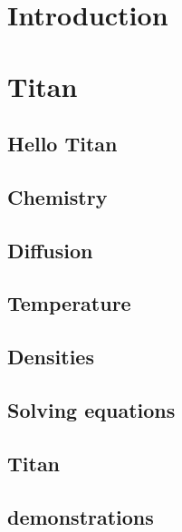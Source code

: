 \documentclass{report}
\begin{document}
\tableofcontents

\part{Introduction}


\part{Titan}
\chapter{Hello Titan}


\chapter{Chemistry}


\chapter{Diffusion}


\chapter{Temperature}


\chapter{Densities}


\chapter{Solving equations}


\appendix
\chapter{Titan}

\chapter{demonstrations}
\label{Titan:the_demo}

\clearpage


\end{document}
